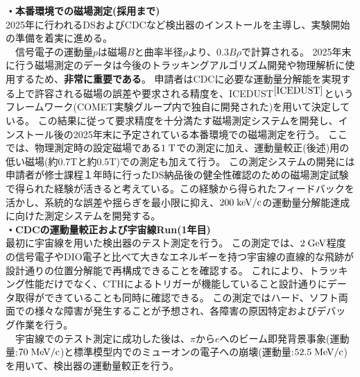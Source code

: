\documentclass[11pt,a4j,dvipdfmx]{jarticle} 					%
\newcommand{\研究課題名}{ミューオン電子転換探索の感度向上に向けた解析手法の開発}
\newcommand{\研究機関名}{大阪大学}
\newcommand{\研究代表者氏名}{高見 翔太   }
\begin{document}
%
\noindent
\textbf{・本番環境での磁場測定(採用まで)}\\
2025年に行われるDSおよびCDCなど検出器のインストールを主導し、実験開始の準備を着実に進める。\\
　信号電子の運動量$p$は磁場$B$と曲率半径$\rho$より、$0.3B\rho$で計算される。
2025年末に行う磁場測定のデータは今後のトラッキングアルゴリズム開発や物理解析に使用するため、\textbf{非常に重要である}。
申請者はCDCに必要な運動量分解能を実現する上で許容される磁場の誤差や要求される精度を、ICEDUST$^{\cite{ICEDUST}}$というフレームワーク(COMET実験グループ内で独自に開発された)を用いて決定している。
この結果に従って要求精度を十分満たす磁場測定システムを開発し、インストール後の2025年末に予定されている本番環境での磁場測定を行う。
ここでは、物理測定時の設定磁場である$1\;\rm{T}$での測定に加え、運動量較正(後述)用の低い磁場(約0.7\;\rm{T}と約0.5\;\rm{T})での測定も加えて行う。
この測定システムの開発には申請者が修士課程１年時に行ったDS納品後の健全性確認のための磁場測定試験で得られた経験が活きると考えている。この経験から得られたフィードバックを活かし、系統的な誤差や揺らぎを最小限に抑え、$200\;\rm{keV/c}$の運動量分解能達成に向けた測定システムを開発する。
\\
\noindent
\textbf{・CDCの運動量較正および宇宙線Run(1年目)}\\
最初に宇宙線を用いた検出器のテスト測定を行う。
この測定では、$2\;\rm{GeV}$程度の信号電子やDIO電子と比べて大きなエネルギーを持つ宇宙線の直線的な飛跡が設計通りの位置分解能で再構成できることを確認する。
これにより、トラッキング性能だけでなく、CTHによるトリガーが機能していること設計通りにデータ取得ができていることも同時に確認できる。
この測定ではハード、ソフト両面での様々な障害が発生することが予想され、各障害の原因特定およびデバッグ作業を行う。\\
　宇宙線でのテスト測定に成功した後は、$\pi$から$e$へのビーム即発背景事象(運動量:$70\;\rm{MeV/c}$)と標準模型内でのミューオンの電子への崩壊(運動量:$52.5\;\rm{MeV/c}$)を用いて、検出器の運動量較正を行う。
\end{document}

